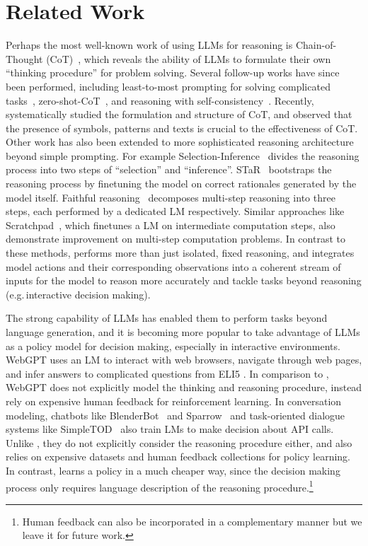 \section{Related Work}

Perhaps the most well-known work of using LLMs for reasoning is Chain-of-Thought (CoT)~\citep{wei2022chain}, which reveals the ability of LLMs to formulate their own ``thinking procedure'' for problem solving. Several follow-up works have since been performed, including least-to-most prompting for solving complicated tasks~\citep{zhou2022least}, zero-shot-CoT~\citep{kojima2022large}, and reasoning with self-consistency~\citep{wang2022self-consistency}. Recently, \citep{madaan2022text} systematically studied the formulation and structure of CoT, and observed that the presence of symbols, patterns and texts is crucial to the effectiveness of CoT.
Other work has also been extended to more sophisticated reasoning architecture beyond simple prompting. For example Selection-Inference~\citep{creswell2022selection} divides the reasoning process into two steps of ``selection'' and ``inference''. STaR~\citep{zelikman2022star} bootstraps the reasoning process by finetuning the model on correct rationales generated by the model itself. Faithful reasoning~\citep{creswell2022faithful} decomposes multi-step reasoning into three steps, each performed by a dedicated LM respectively. Similar approaches like Scratchpad~\citep{nye2021show}, which finetunes a LM on intermediate computation steps, also demonstrate improvement on multi-step computation problems.
In contrast to these methods, \model{} performs more than just isolated, fixed reasoning, and integrates model actions and their corresponding observations into a coherent stream of inputs for the model to reason more accurately and tackle tasks beyond reasoning (e.g.\,interactive decision making).

The strong capability of LLMs has enabled them to perform tasks beyond language generation, and it is becoming more popular to take advantage of LLMs as a policy model for decision making, especially in interactive environments. WebGPT \citep{nakano2021webgpt} 
uses an LM to interact with web browsers, navigate through web pages, and infer answers to complicated questions from ELI5 \citep{fan-etal-2019-eli5}. In comparison to \model, WebGPT does not explicitly model the thinking and reasoning procedure, instead rely on expensive human feedback for reinforcement learning.
In conversation modeling, chatbots like BlenderBot~\citep{shuster2022blenderbot3} and Sparrow~\citep{amelia2022improving} {and task-oriented dialogue systems like SimpleTOD~\citep{hosseini2020simple}} also train LMs to make decision about API calls. Unlike \model, they do not explicitly consider the reasoning procedure either, and also relies on expensive datasets and human feedback collections for policy learning. In contrast, \model{} learns a policy in a much cheaper way, since the decision making process only requires language description of the reasoning procedure.\footnote{Human feedback can also be incorporated in a complementary manner but we leave it for future work.}

